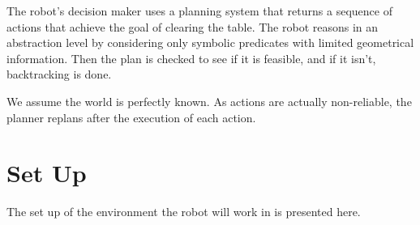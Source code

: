 The robot's decision maker uses a planning system that returns a sequence of actions that achieve the goal of clearing the table. 
The robot reasons in an abstraction level by considering only symbolic predicates with limited geometrical information. Then the plan is checked to see if it is feasible, and if it isn't, backtracking is done.

We assume the world is perfectly known. As actions are actually non-reliable, the planner replans after the execution of each action.  

\section{Set Up}
The set up of the environment the robot will work in is presented here. 

